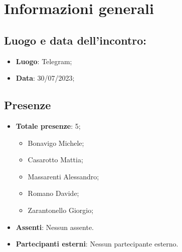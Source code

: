 \section{Informazioni generali}
    \subsection{Luogo e data dell'incontro:}
    \begin{itemize}
        \item \textbf{Luogo}: Telegram;
        \item \textbf{Data}: 30/07/2023;
    \end{itemize}
    \subsection{Presenze}
    \begin{itemize}
        \item \textbf{Totale presenze}: 5;
        \begin{itemize}
            \item Bonavigo Michele;
            \item Casarotto Mattia;
            \item Massarenti Alessandro;
            \item Romano Davide;
            \item Zarantonello Giorgio;
        \end{itemize}
        \item \textbf{Assenti}: Nessun assente.
        \item \textbf{Partecipanti esterni}: Nessun partecipante esterno.
    \end{itemize}